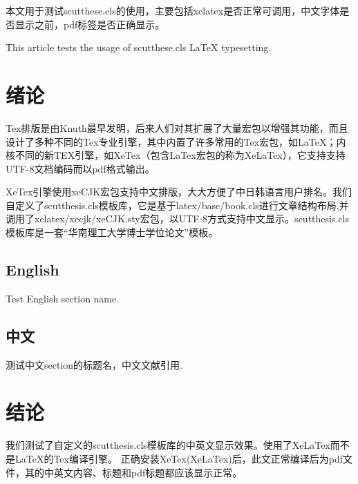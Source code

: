 \documentclass[unicode]{scutthesis}
\begin{document}

\frontmatter

\begin{abstractCn}
本文用于测试scutthese.cls的使用，主要包括xelatex是否正常可调用，中文字体是否显示之前，pdf标签是否正确显示。
\end{abstractCn}

\begin{abstractEn}
This article tests the usage of scutthese.cls \LaTeX{} typesetting.
\end{abstractEn}


\tableofcontents{}
 
\mainmatter

\chapter{绪论}
Tex排版\cite{knuth1986thetexbook}是由Knuth最早发明，后来人们对其扩展了大量宏包以增强其功能，而且设计了多种不同的Tex专业引擎，其中内置了许多常用的Tex宏包，如\LaTeX{}\cite{goossens1994thelatex}；内核不同的新TEX引擎，如XeTex（包含LaTex宏包的称为XeLaTex），它支持支持UTF-8文档编码而以pdf格式输出。

XeTex引擎使用xeCJK宏包支持中文排版，大大方便了中日韩语言用户排名。我们自定义了scutthesis.cls模板库，它是基于latex/base/book.cls进行文章结构布局,并调用了xelatex/xecjk/xeCJK.sty宏包，以UTF-8方式支持中文显示。scutthesis.cls模板库是一套“华南理工大学博士学位论文”模板。

\section{English}
Test English section name.

\section{中文}
测试中文section的标题名，中文文献引用\cite{cnproceed, wang_model_2009}.


\chapter{结论}
我们测试了自定义的scutthesis.cls模板库的中英文显示效果。使用了XeLaTex而不是\LaTeX{}的Tex编译引擎。
正确安装XeTex(XeLaTex)后，此文正常编译后为pdf文件，其的中英文内容、标题和pdf标题都应该显示正常。


\backmatter
\end{document}
